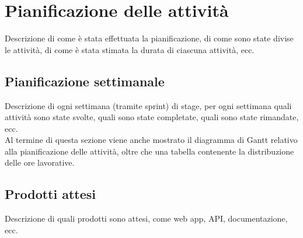\section{Pianificazione delle attività}
\label{sez:pianificazione-attivita}

Descrizione di come è stata effettuata la pianificazione, di come sono state divise le attività, di come è stata stimata la durata di ciascuna attività, ecc.\\

\subsection{Pianificazione settimanale}
\label{sez:pianificazione-settimanale}

Descrizione di ogni settimana (tramite sprint) di stage, per ogni settimana quali attività sono state svolte, quali sono state completate, quali sono state rimandate, ecc.\\
Al termine di questa sezione viene anche mostrato il diagramma di Gantt relativo alla pianificazione delle attività, oltre che una tabella contenente la distribuzione 
delle ore lavorative.\\

\subsection{Prodotti attesi}
\label{sez:prodotti-attesi}

Descrizione di quali prodotti sono attesi, come web app, API, documentazione, ecc.\\